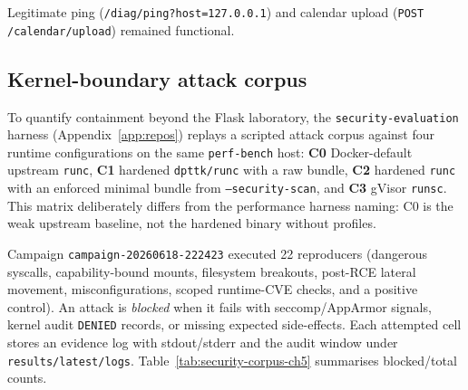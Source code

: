 Legitimate ping (\texttt{/diag/ping?host=127.0.0.1}) and calendar upload (\texttt{POST /calendar/upload}) remained functional.

\subsection{Kernel-boundary attack corpus}\label{sec:exp-security-corpus}

To quantify containment beyond the Flask laboratory, the \texttt{security-evaluation} harness (Appendix~\ref{app:repos}) replays a scripted attack corpus against four runtime configurations on the same \texttt{perf-bench} host: \textbf{C0} Docker-default upstream \texttt{runc}, \textbf{C1} hardened \texttt{dpttk/runc} with a raw bundle, \textbf{C2} hardened \texttt{runc} with an enforced minimal bundle from \texttt{--security-scan}, and \textbf{C3} gVisor \texttt{runsc}. This matrix deliberately differs from the performance harness naming: C0 is the weak upstream baseline, not the hardened binary without profiles.

Campaign \texttt{campaign-20260618-222423} executed 22 reproducers (dangerous syscalls, capability-bound mounts, filesystem breakouts, post-RCE lateral movement, misconfigurations, scoped runtime-CVE checks, and a positive control). An attack is \emph{blocked} when it fails with seccomp/AppArmor signals, kernel audit \texttt{DENIED} records, or missing expected side-effects. Each attempted cell stores an evidence log with stdout/stderr and the audit window under \texttt{results/latest/logs}. Table~\ref{tab:security-corpus-ch5} summarises blocked/total counts.

\begin{table}[ht]
\centering
\caption{Kernel-boundary security effectiveness (campaign \texttt{20260618-222423}). Misconfiguration rows apply only to Docker-backed configs.}
\label{tab:security-corpus-ch5}
\end{table}

